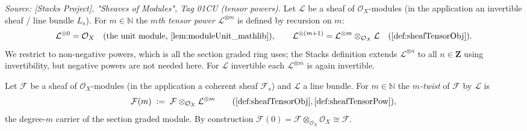 \begin{definition}
  \label{def:sheafTensorPow}
  \textit{Source: [Stacks Project], "Sheaves of Modules", Tag 01CU (tensor
  powers).}
  Let \(\mathcal{L}\) be a sheaf of \(\mathcal{O}_X\)-modules (in the application
  an invertible sheaf / line bundle \(L_s\)). For \(m \in \mathbb{N}\) the
  \emph{\(m\)th tensor power} \(\mathcal{L}^{\otimes m}\) is defined by recursion
  on \(m\):
  \[
    \mathcal{L}^{\otimes 0} = \mathcal{O}_X
      \quad(\text{the unit module, \cref{lem:moduleUnit_mathlib}}),
    \qquad
    \mathcal{L}^{\otimes (m+1)}
      = \mathcal{L}^{\otimes m} \otimes_{\mathcal{O}_X} \mathcal{L}
        \quad(\cref{def:sheafTensorObj}).
  \]
  We restrict to non-negative powers, which is all the section graded ring uses;
  the Stacks definition extends \(\mathcal{L}^{\otimes n}\) to all
  \(n \in \mathbf{Z}\) using invertibility, but negative powers are not needed
  here. For \(\mathcal{L}\) invertible each \(\mathcal{L}^{\otimes m}\) is again
  invertible.
\end{definition}



\begin{definition}
  \label{def:sheafModuleTwist}
  Let \(\mathcal{F}\) be a sheaf of \(\mathcal{O}_X\)-modules (in the application
  a coherent sheaf \(\mathcal{F}_s\)) and \(\mathcal{L}\) a line bundle. For
  \(m \in \mathbb{N}\) the \emph{\(m\)-twist} of \(\mathcal{F}\) by
  \(\mathcal{L}\) is
  \[
    \mathcal{F}(m) \;:=\;
      \mathcal{F} \otimes_{\mathcal{O}_X} \mathcal{L}^{\otimes m}
      \qquad(\cref{def:sheafTensorObj}, \cref{def:sheafTensorPow}),
  \]
  the degree-\(m\) carrier of the section graded module. By construction
  \(\mathcal{F}(0) = \mathcal{F} \otimes_{\mathcal{O}_X} \mathcal{O}_X \cong
  \mathcal{F}\).
\end{definition}



